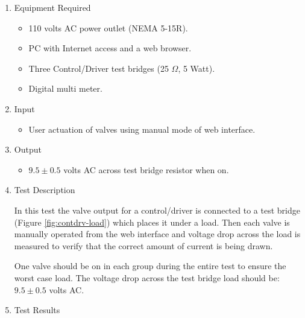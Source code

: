 \documentclass{article}
\begin{document}
\begin{enumerate}
\item Equipment Required
	\begin{itemize}
	\item 110 volts AC power outlet (NEMA 5-15R).
	\item PC with Internet access and a web browser.
	\item Three Control/Driver test bridges (25 $\Omega$, 5 Watt).
	\item Digital multi meter.
	\end{itemize}
\item Input
	\begin{itemize}
	\item User actuation of valves using manual mode of web interface.
	\end{itemize}
\item Output
	\begin{itemize}
	\item $9.5\pm0.5$ volts AC across test bridge resistor when on.
	\end{itemize}

\item Test Description \\
\vspace{0.5em}

In this test the valve output for a control/driver is connected
to a test bridge (Figure \ref{fig:contdrv-load}) which places
it under a load.
Then each valve is manually operated from the web interface and
voltage drop across the load is measured to verify that the
correct amount of current is being drawn.

One valve should be on in each group during the entire test
to ensure the worst case load.
The voltage drop across the test bridge load should be: $9.5\pm0.5$ volts AC. \\

\item Test Results \\
	\vspace{1em}


\end{enumerate}
\end{document}
